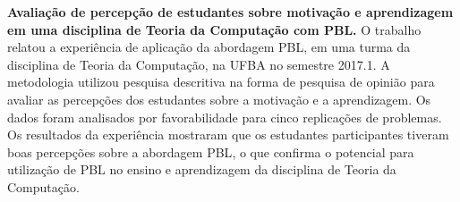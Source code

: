 \item{\textbf{Avaliação de percepção de estudantes sobre
motivação e aprendizagem em uma disciplina de Teoria da
Computação com \ac{PBL}.}
O trabalho relatou a experiência de aplicação da abordagem
\ac{PBL}, em uma turma da disciplina de Teoria da Computação, na
\ac{UFBA} no semestre 2017.1.
A metodologia utilizou pesquisa descritiva na forma de pesquisa
de opinião para avaliar as percepções dos estudantes sobre
a motivação e a aprendizagem.
Os dados foram analisados por favorabilidade para cinco
replicações de problemas.
Os resultados da experiência mostraram que os estudantes
participantes tiveram boas percepções sobre a abordagem \ac{PBL},
o que confirma o potencial para utilização de \ac{PBL}
no ensino e aprendizagem da disciplina de Teoria
da Computação.}
